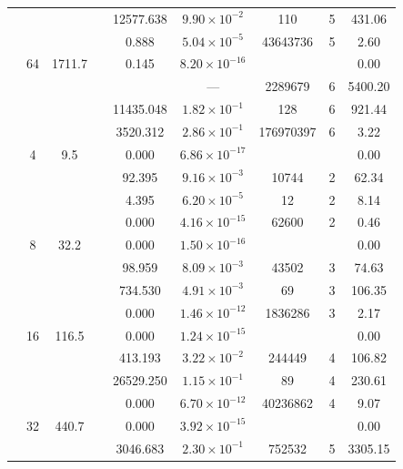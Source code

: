 \begin{table}[htbp]
\begin{tabular}{l S[table-format=3.0] S[table-format=4.1] l S[table-format=3.3] S[table-format=1.2e2] S[table-format=6.0] S[table-format=2.0] S[table-format=4.2]}
     &  &  &  & 12577.638 & $9.90 \times 10^{-2}$ & 110 & 5 & 431.06 \\
     &  &  &  & 0.888 & $5.04 \times 10^{-5}$ & 43643736 & 5 & 2.60 \\
     & 64 & 1711.7 &  & 0.145 & $8.20 \times 10^{-16}$ & {\text{---}} & {\text{---}} & 0.00 \\
     &  &  &  & {\text{---}} & ${\text{---}}$ & 2289679 & 6 & 5400.20 \\
     &  &  &  & 11435.048 & $1.82 \times 10^{-1}$ & 128 & 6 & 921.44 \\
     &  &  &  & 3520.312 & $2.86 \times 10^{-1}$ & 176970397 & 6 & 3.22 \\
    \midrule
     & 4 & 9.5 &  & 0.000 & $6.86 \times 10^{-17}$ & {\text{---}} & {\text{---}} & 0.00 \\
     &  &  &  & 92.395 & $9.16 \times 10^{-3}$ & 10744 & 2 & 62.34 \\
     &  &  &  & 4.395 & $6.20 \times 10^{-5}$ & 12 & 2 & 8.14 \\
     &  &  &  & 0.000 & $4.16 \times 10^{-15}$ & 62600 & 2 & 0.46 \\
     & 8 & 32.2 &  & 0.000 & $1.50 \times 10^{-16}$ & {\text{---}} & {\text{---}} & 0.00 \\
     &  &  &  & 98.959 & $8.09 \times 10^{-3}$ & 43502 & 3 & 74.63 \\
     &  &  &  & 734.530 & $4.91 \times 10^{-3}$ & 69 & 3 & 106.35 \\
     &  &  &  & 0.000 & $1.46 \times 10^{-12}$ & 1836286 & 3 & 2.17 \\
     & 16 & 116.5 &  & 0.000 & $1.24 \times 10^{-15}$ & {\text{---}} & {\text{---}} & 0.00 \\
     &  &  &  & 413.193 & $3.22 \times 10^{-2}$ & 244449 & 4 & 106.82 \\
     &  &  &  & 26529.250 & $1.15 \times 10^{-1}$ & 89 & 4 & 230.61 \\
     &  &  &  & 0.000 & $6.70 \times 10^{-12}$ & 40236862 & 4 & 9.07 \\
     & 32 & 440.7 &  & 0.000 & $3.92 \times 10^{-15}$ & {\text{---}} & {\text{---}} & 0.00 \\
     &  &  &  & 3046.683 & $2.30 \times 10^{-1}$ & 752532 & 5 & 3305.15 \\

\end{tabular}
\end{table}
